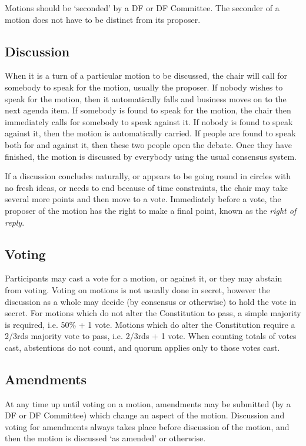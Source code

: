 \documentclass[a4paper, 11pt]{article} %
\begin{document}
Motions should be `seconded' by a DF or DF Committee.  The seconder of a motion does not have to be distinct from its proposer.

\subsection{Discussion}
When it is a turn of a particular motion to be discussed, the chair will call for somebody to speak for the motion, usually the proposer.  If nobody wishes to speak for the motion, then it automatically falls and business moves on to the next agenda item.  If somebody is found to speak for the motion, the chair then immediately calls for somebody to speak against it.  If nobody is found to speak against it, then the motion is automatically carried.  If people are found to speak both for and against it, then these two people open the debate.  Once they have finished, the motion is discussed by everybody using the usual consensus system.

If a discussion concludes naturally, or appears to be going round in circles with no fresh ideas, or needs to end because of time constraints, the chair may take several more points and then move to a vote.  Immediately before a vote, the proposer of the motion has the right to make a final point, known as the \emph{right of reply}.

\subsection{Voting}
\label{sec:motionvoting}
Participants may cast a vote for a motion, or against it, or they may abstain from voting.  Voting on motions is not usually done in secret, however the discussion as a whole may decide (by consensus or otherwise) to hold the vote in secret.  For motions which do not alter the Constitution to pass, a simple majority is required, i.e. 50\% + 1 vote.  Motions which do alter the Constitution require a 2/3rds majority vote to pass, i.e. 2/3rds + 1 vote.  When counting totals of votes cast, abstentions do not count, and quorum applies only to those votes cast.

\subsection{Amendments}
At any time up until voting on a motion, amendments may be submitted (by a DF or DF Committee) which change an aspect of the motion.  Discussion and voting for amendments always takes place before discussion of the motion, and then the motion is discussed `as amended' or otherwise.
\end{document}

